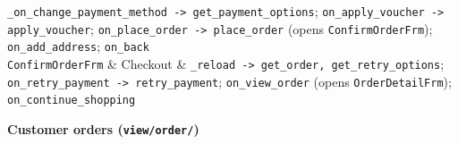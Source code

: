 {\begin{longtable}
\texttt{\_\allowbreak{}on\_\allowbreak{}change\_\allowbreak{}payment\_\allowbreak{}method -\textgreater{}\allowbreak{} get\_\allowbreak{}payment\_\allowbreak{}options};
\texttt{on\_\allowbreak{}apply\_\allowbreak{}voucher -\textgreater{}\allowbreak{} apply\_\allowbreak{}voucher};
\texttt{on\_\allowbreak{}place\_\allowbreak{}order -\textgreater{}\allowbreak{} place\_\allowbreak{}order} (opens
\texttt{ConfirmOrderFrm}); \texttt{on\_\allowbreak{}add\_\allowbreak{}address};
\texttt{on\_\allowbreak{}back} \\
\texttt{ConfirmOrderFrm} & Checkout &
\texttt{\_\allowbreak{}reload -\textgreater{}\allowbreak{} get\_\allowbreak{}order,\allowbreak{} get\_\allowbreak{}retry\_\allowbreak{}options};
\texttt{on\_\allowbreak{}retry\_\allowbreak{}payment -\textgreater{}\allowbreak{} retry\_\allowbreak{}payment};
\texttt{on\_\allowbreak{}view\_\allowbreak{}order} (opens \texttt{OrderDetailFrm});
\texttt{on\_\allowbreak{}continue\_\allowbreak{}shopping} \\
\end{longtable}}

\textbf{Customer orders (\texttt{view/\allowbreak{}order/\allowbreak{}})}

